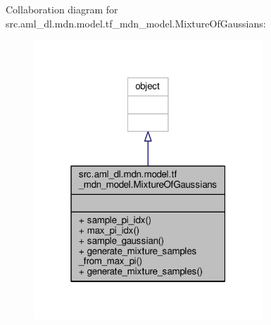 Collaboration diagram for src.\-aml\-\_\-dl.\-mdn.\-model.\-tf\-\_\-mdn\-\_\-model.\-Mixture\-Of\-Gaussians\-:
\nopagebreak
\begin{figure}[H]
\begin{center}
\leavevmode
\includegraphics[width=244pt]{classsrc_1_1aml__dl_1_1mdn_1_1model_1_1tf__mdn__model_1_1_mixture_of_gaussians__coll__graph}
\end{center}
\end{figure}
